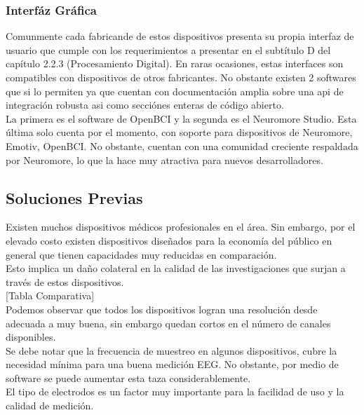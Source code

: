 \subsubsection{Interfáz Gráfica}
\label{sec:orgaf127b7}
Comunmente cada fabricande de estos dispositivos presenta su propia interfaz de usuario que cumple con los requerimientos a presentar en el subtítulo D del capítulo 2.2.3 (Procesamiento Digital). En raras ocasiones, estas interfaces son compatibles con dispositivos de otros fabricantes. No obstante existen 2 softwares que si lo permiten ya que cuentan con documentación amplia sobre una api de integración robusta asi como secciónes enteras de código abierto.\\

La primera es el software de OpenBCI y la segunda es el Neuromore Studio. Esta última solo cuenta por el momento, con soporte para dispositivos de Neuromore, Emotiv, OpenBCI. No obstante, cuentan con una comunidad creciente respaldada por Neuromore, lo que la hace muy atractiva para nuevos desarrolladores.\\

\subsection{Soluciones Previas}
\label{sec:orgbb62d30}
Existen muchos dispositivos médicos profesionales en el área. Sin embargo, por el elevado costo existen dispositivos diseñados para la economía del público en general que tienen capacidades muy reducidas en comparación.\\
Esto implica un daño colateral en la calidad de las investigaciones que surjan a través de estos dispositivos.\\

[Tabla Comparativa]\\

Podemos observar que todos los dispositivos logran una resolución desde adecuada a muy buena, sin embargo quedan cortos en el número de canales disponibles.\\

Se debe notar que la frecuencia de muestreo en algunos dispositivos, cubre la necesidad mínima para una buena medición EEG. No obstante, por medio de software se puede aumentar esta taza considerablemente.\\

El tipo de electrodos es un factor muy importante para la facilidad de uso y la calidad de medición.\\

